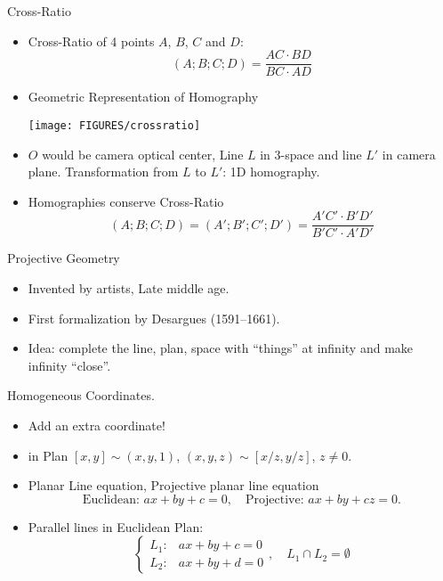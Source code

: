 \documentclass[9pt]{beamer}
\begin{document}
\begin{frame}[t]{Cross-Ratio}
  \begin{itemize}
  \item Cross-Ratio of 4 points $A$, $B$, $C$ and $D$:
    $$
    (A;B;C;D) = \frac{AC\cdot BD}{BC\cdot AD}
    $$
  \item Geometric Representation of Homography
    \begin{center}
      \texttt{[image: FIGURES/crossratio]}
    \end{center}
  \item $O$ would be camera optical center, Line $L$ in 3-space
    and line $L'$ in camera plane. Transformation from $L$ to $L'$: 1D homography. 
  \item Homographies conserve Cross-Ratio
    $$
    (A;B;C;D) = (A';B';C';D') = \frac{A'C'\cdot B'D'}{B'C'\cdot A'D'}
    $$
  \end{itemize}
  
\end{frame}

\begin{frame}[t]{Projective Geometry}
  \begin{itemize}
  \item Invented by artists, Late middle age.
  \item First formalization by Desargues (1591--1661).
  \item Idea: complete the line, plan, space with ``things'' at infinity and make infinity ``close''.
  \end{itemize}
  Homogeneous Coordinates.
  \begin{itemize}
  \item Add an extra coordinate!
  \item in Plan $[x,y]\sim (x,y,1)$, $(x,y,z)\sim [x/z,y/z]$, $z\not=0$.
  \item Planar Line equation, Projective planar line equation 
    $$
    \text{Euclidean: } ax + by + c = 0,\quad \text{Projective: } ax + by + cz = 0.
    $$
  \item Parallel lines in Euclidean Plan:
    $$
    \begin{cases}
      L_1: &ax + by + c = 0\\
      L_2: &ax + by + d = 0
    \end{cases},\quad
    L_1\cap L_2 = \emptyset
    $$
  \end{itemize}
\end{frame}
\end{document}
